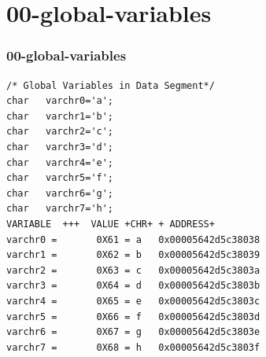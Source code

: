 \documentclass[xcolor=table, notheorems, hyperref={pdfpagelabels=false}]{beamer}
\begin{document}
\section{00-global-variables}
\begin{frame}[fragile]
\frametitle{00-global-variables}
\begin{lstlisting}[basicstyle=\ttfamily\footnotesize]
/* Global Variables in Data Segment*/
char   varchr0='a';
char   varchr1='b';
char   varchr2='c';
char   varchr3='d';
char   varchr4='e';
char   varchr5='f';
char   varchr6='g';
char   varchr7='h';
VARIABLE  +++  VALUE +CHR+ + ADDRESS+
varchr0 =       0X61 = a   0x00005642d5c38038
varchr1 =       0X62 = b   0x00005642d5c38039
varchr2 =       0X63 = c   0x00005642d5c3803a
varchr3 =       0X64 = d   0x00005642d5c3803b
varchr4 =       0X65 = e   0x00005642d5c3803c
varchr5 =       0X66 = f   0x00005642d5c3803d
varchr6 =       0X67 = g   0x00005642d5c3803e
varchr7 =       0X68 = h   0x00005642d5c3803f
\end{lstlisting}

\begin{minipage}[t]{120mm}
\end{minipage}

\end{frame}

\end{document}
